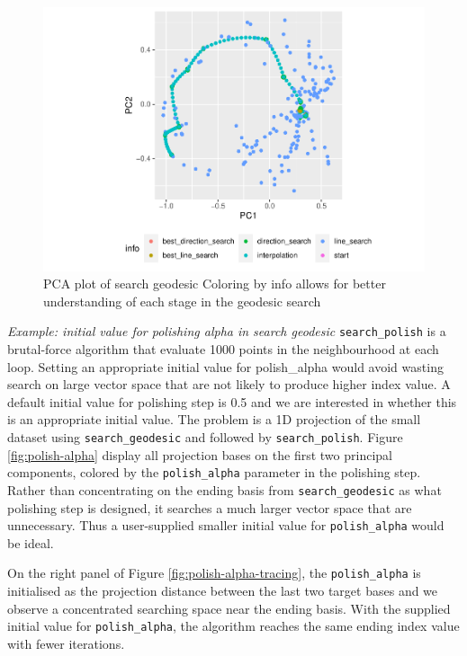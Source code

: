\documentclass[12pt]{article}
\begin{document}
\begin{figure}
\centering
\includegraphics{paper_files/figure-latex/pca-1.pdf}
\caption{\label{pca}PCA plot of search geodesic Coloring by info allows
for better understanding of each stage in the geodesic search}
\end{figure}

\emph{Example: initial value for polishing alpha in search geodesic}
\texttt{search\_polish} is a brutal-force algorithm that evaluate 1000
points in the neighbourhood at each loop. Setting an appropriate initial
value for polish\_alpha would avoid wasting search on large vector space
that are not likely to produce higher index value. A default initial
value for polishing step is 0.5 and we are interested in whether this is
an appropriate initial value. The problem is a 1D projection of the
small dataset using \texttt{search\_geodesic} and followed by
\texttt{search\_polish}. Figure \ref{fig:polish-alpha} display all
projection bases on the first two principal components, colored by the
\texttt{polish\_alpha} parameter in the polishing step. Rather than
concentrating on the ending basis from \texttt{search\_geodesic} as what
polishing step is designed, it searches a much larger vector space that
are unnecessary. Thus a user-supplied smaller initial value for
\texttt{polish\_alpha} would be ideal.

On the right panel of Figure \ref{fig:polish-alpha-tracing}, the
\texttt{polish\_alpha} is initialised as the projection distance between
the last two target bases and we observe a concentrated searching space
near the ending basis. With the supplied initial value for
\texttt{polish\_alpha}, the algorithm reaches the same ending index
value with fewer iterations.
\end{document}
